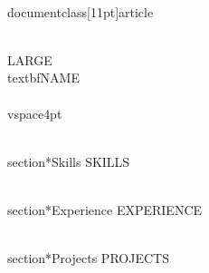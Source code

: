 \\documentclass[11pt]{article}
\begin{document}
{\\LARGE \\textbf{{{NAME}}}} \\
\\vspace{4pt}

\\section*{Skills}
{{SKILLS}}

\\section*{Experience}
{{EXPERIENCE}}

\\section*{Projects}
{{PROJECTS}}

\
\end{document}

